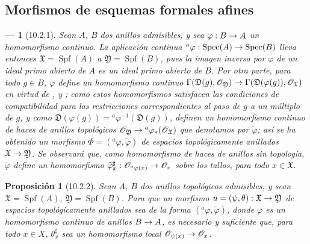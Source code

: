 \documentclass[oneside]{amsart}
\theoremstyle{ega-env-style}
\newtheorem*{env}{---}
\theoremstyle{ega-thm-env-style}
\newtheorem*{proposition}{Proposición}
\theoremstyle{ega-defn-env-style}
\renewcommand{\to}{\mathchoice{\longrightarrow}{\rightarrow}{\rightarrow}{\rightarrow}}
\let\EGAOriginalLabel\label
\renewcommand{\label}[1]{\phantomsection\EGAOriginalLabel{#1}}
\begin{document}
\subsection{Morfismos de esquemas formales afines}
\label{subsection:I.10.2}

\begin{env}[10.2.1]
\label{I.10.2.1}
Sean $A$, $B$ dos anillos admisibles, y sea $\varphi:B\to A$ un homomorfismo \emph{continuo}.
La aplicación continua $ {}^a\varphi:\operatorname{Spec}(A)\to\operatorname{Spec}(B)$  lleva entonces $\mathfrak{X}=\operatorname{Spf}(A)$ a $\mathfrak{Y}=\operatorname{Spf}(B)$, pues la imagen inversa por $\varphi$ de un ideal primo abierto de $A$ es un ideal primo abierto de $B$.
Por otra parte, para todo $g\in B$,
$\varphi$ define un homomorfismo continuo
$\Gamma(\mathfrak{D}(g),\mathscr{O}_{\mathfrak{Y}})\to
\Gamma(\mathfrak{D}(\varphi(g)),\mathscr{O}_{\mathfrak{X}})$
en virtud de ,
y ; como estos homomorfismos satisfacen las condiciones de compatibilidad para las restricciones correspondientes al paso de $g$ a un múltiplo de $g$, y como $\mathfrak{D}(\varphi(g))={}^a\varphi^{-1}(\mathfrak{D}(g))$, definen un homomorfismo \emph{continuo} de haces de anillos topológicos $\mathscr{O}_{\mathfrak{Y}}\to
{}^a\varphi_*(\mathscr{O}_{\mathfrak{X}})$  que denotamos por $\widetilde{\varphi}$; así se ha obtenido un morfismo $\Phi=({}^a\varphi,\widetilde{\varphi})$ de espacios topológicamente anillados $\mathfrak{X}\to\mathfrak{Y}$.
Se observará que, como homomorfismo de haces de anillos sin topología, $\widetilde{\varphi}$ define un homomorfismo $\widetilde{\varphi}_x^\sharp:
\mathscr{O}_{{}^a\varphi(x)}\to\mathscr{O}_x$ sobre los tallos, para todo $x\in\mathfrak{X}$.
\end{env}

\begin{proposition}[10.2.2]
\label{I.10.2.2}
Sean $A$, $B$ dos anillos topológicos admisibles, y sean $\mathfrak{X}=\operatorname{Spf}(A)$, $\mathfrak{Y}=\operatorname{Spf}(B)$. Para que un morfismo $u=(\psi,\theta):\mathfrak{X}\to\mathfrak{Y}$ de espacios topológicamente anillados sea de la forma $({}^a\varphi,\widetilde{\varphi})$, donde $\varphi$ es un homomorfismo continuo de anillos $B\to A$, es necesario y suficiente que, para todo $x\in X$, $\theta_x^\sharp$ sea un homomorfismo local $\mathscr{O}_{\psi(x)}\to\mathscr{O}_x$.
\end{proposition}
\end{document}
